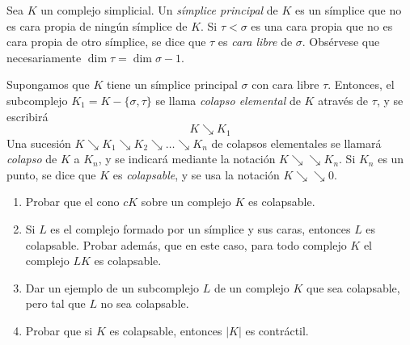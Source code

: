 \documentclass[twoside]{article}
\newcommand{\colapso}{{\searrow\!\!\!\!\searrow}}
\begin{document}
\newpage

\begin{ejercicio}{1.6}
Sea $K$ un complejo simplicial.
Un \emph{símplice principal} de $K$ es un símplice que no es cara propia de ningún símplice de $K$.
Si $τ < σ$ es una cara propia que no es cara propia de otro símplice, se dice que $τ$ es \emph{cara libre} de $σ$.
Obsérvese que necesariamente $\dim τ = \dim σ - 1$.

Supongamos que $K$ tiene un símplice principal $σ$ con cara libre $τ$.
Entonces, el subcomplejo $K_1 = K - \{σ,τ\}$ se llama \emph{colapso elemental} de $K$ através de $τ$, y se escribirá
\[ K \searrow K_1 \]
Una sucesión $K \searrow K_1 \searrow K_2 \searrow \dots \searrow K_n$ de colapsos elementales se llamará \emph{colapso} de $K$ a $K_n$, y se indicará mediante la notación $K \colapso K_n$.
Si $K_n$ es un punto, se dice que $K$ es \emph{colapsable}, y se usa la notación $K \colapso 0$.
\begin{enumerate}
\item Probar que el cono $cK$ sobre un complejo $K$ es colapsable.
\item Si $L$ es el complejo formado por un símplice y sus caras, entonces $L$ es colapsable.
Probar además, que en este caso, para todo complejo $K$ el complejo $LK$ es colapsable.
\item Dar un ejemplo de un subcomplejo $L$ de un complejo $K$ que sea colapsable, pero tal que $L$ no sea colapsable.
\item Probar que si $K$ es colapsable, entonces $|K|$ es contráctil.
\end{enumerate}
\end{ejercicio}
\end{document}

